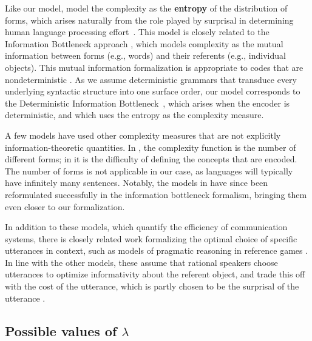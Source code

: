 \documentclass[10pt,twoside,lineno]{article}
\newcommand{\key}[1]{\textbf{#1}}
\begin{document}
Like our model, \cite{ferreri2003least,ferrericancho2007global,futrell2017memory} model the complexity as the \key{entropy} of the distribution of forms, which arises naturally from the role played by surprisal in determining human language processing effort~\cite{hale2001probabilistic,levy2008expectation,smith2013effect}.
This model is closely related to the Information Bottleneck approach \cite{zaslavsky2018efficient, zaslavsky2019semantic}, which models complexity as the mutual information between forms (e.g., words) and their referents (e.g., individual objects).
This mutual information formalization is appropriate to codes that are nondeterministic \cite{zaslavsky2018efficient}.
As we assume deterministic grammars that transduce every underlying syntactic structure into one surface order, our model corresponds to the Deterministic Information Bottleneck~\cite{strouse2017deterministic}, which arises when the encoder is deterministic, and which uses the entropy as the complexity measure.

A few models have used other complexity measures that are not explicitly information-theoretic quantities.
In \cite{regier2007color, xu2014numeral, xu2016historical}, the complexity function is the number of different forms; in \cite{kemp2012kinship} it is the difficulty of defining the concepts that are encoded.
The number of forms is not applicable in our case, as languages will typically have infinitely many sentences.
Notably, the models in \cite{regier2007color, xu2016historical} have since been reformulated successfully in the information bottleneck formalism, bringing them even closer to our formalization.


In addition to these models, which quantify the efficiency of communication systems, there is closely related work formalizing the optimal choice of specific utterances in context, such as models of pragmatic reasoning in reference games \cite{frank2012predicting,goodman2013knowledge, kao2014nonliteral}.
In line with the other models, these assume that rational speakers choose utterances to optimize informativity about the referent object, and trade this off with the cost of the utterance, which is partly chosen to be the surprisal of the utterance \cite{bennett2018extremely}.




\subsection{Possible values of $\lambda$}\label{sec:lambda}
\end{document}
